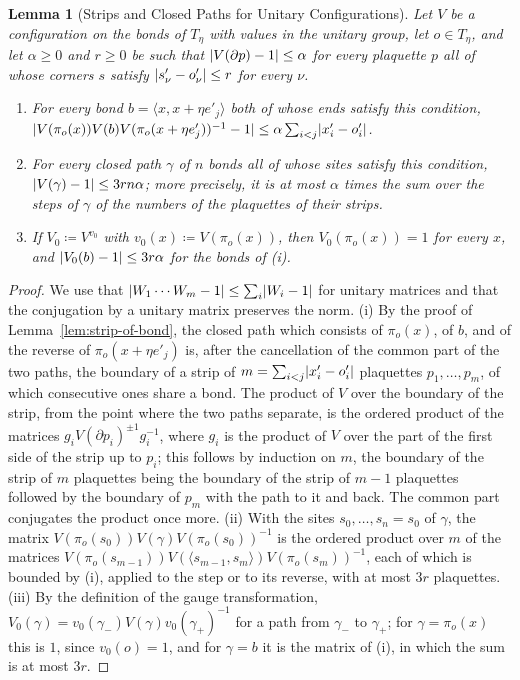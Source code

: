 \documentclass[11pt]{preprint}
\DeclarePairedDelimiter{\abs}{\lvert}{\rvert}
\numberwithin{equation}{section}
\newtheorem{lemma}[theorem]{Lemma}
\theoremstyle{definition}
\theoremstyle{remark}
\theoremstyle{plain}
\begin{document}
\begin{lemma}[Strips and Closed Paths for Unitary Configurations]\label{lem:unitary-strip}
Let $V$ be a configuration on the bonds of $T_\eta$ with values in the unitary group, let $o \in T_\eta$, and let $\alpha \geq 0$ and $r \geq 0$ be such that $\abs{V(\partial p) - 1} \leq \alpha$ for every plaquette $p$ all of whose corners $s$ satisfy $\abs{s'_\nu - o'_\nu} \leq r$ for every $\nu$.
\begin{enumerate}[label=(\roman*)]
\item For every bond $b = \langle x, x + \eta e'_j\rangle$ both of whose ends satisfy this condition, $\abs{V(\pi_o(x))V(b)V(\pi_o(x + \eta e'_j))^{-1} - 1} \leq \alpha\sum_{i < j}\abs{x'_i - o'_i}$.
\item For every closed path $\gamma$ of $n$ bonds all of whose sites satisfy this condition, $\abs{V(\gamma) - 1} \leq 3rn\alpha$; more precisely, it is at most $\alpha$ times the sum over the steps of $\gamma$ of the numbers of the plaquettes of their strips.
\item If $V_0 \coloneqq V^{v_0}$ with $v_0(x) \coloneqq V(\pi_o(x))$, then $V_0(\pi_o(x)) = 1$ for every $x$, and $\abs{V_0(b) - 1} \leq 3r\alpha$ for the bonds of (i).
\end{enumerate}
\end{lemma}

\begin{proof}
We use that $\abs{W_1 \cdots W_m - 1} \leq \sum_i\abs{W_i - 1}$ for unitary matrices and that the conjugation by a unitary matrix preserves the norm. (i) By the proof of Lemma~\ref{lem:strip-of-bond}, the closed path which consists of $\pi_o(x)$, of $b$, and of the reverse of $\pi_o(x + \eta e'_j)$ is, after the cancellation of the common part of the two paths, the boundary of a strip of $m = \sum_{i < j}\abs{x'_i - o'_i}$ plaquettes $p_1, \dots, p_m$, of which consecutive ones share a bond. The product of $V$ over the boundary of the strip, from the point where the two paths separate, is the ordered product of the matrices $g_iV(\partial p_i)^{\pm1}g_i^{-1}$, where $g_i$ is the product of $V$ over the part of the first side of the strip up to $p_i$; this follows by induction on $m$, the boundary of the strip of $m$ plaquettes being the boundary of the strip of $m - 1$ plaquettes followed by the boundary of $p_m$ with the path to it and back. The common part conjugates the product once more. (ii) With the sites $s_0, \dots, s_n = s_0$ of $\gamma$, the matrix $V(\pi_o(s_0))V(\gamma)V(\pi_o(s_0))^{-1}$ is the ordered product over $m$ of the matrices $V(\pi_o(s_{m-1}))V(\langle s_{m-1}, s_m\rangle)V(\pi_o(s_m))^{-1}$, each of which is bounded by (i), applied to the step or to its reverse, with at most $3r$ plaquettes. (iii) By the definition of the gauge transformation, $V_0(\gamma) = v_0(\gamma_-)V(\gamma)v_0(\gamma_+)^{-1}$ for a path from $\gamma_-$ to $\gamma_+$; for $\gamma = \pi_o(x)$ this is $1$, since $v_0(o) = 1$, and for $\gamma = b$ it is the matrix of (i), in which the sum is at most $3r$.
\end{proof}
\end{document}
